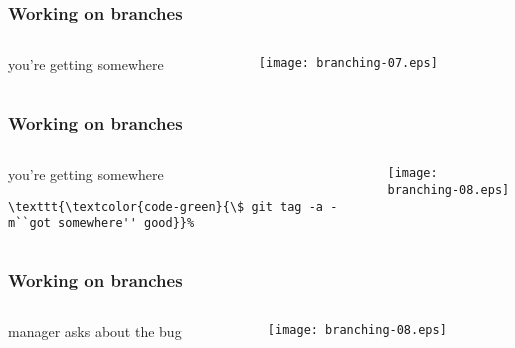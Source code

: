 \documentclass[english]{beamer}
\newcommand{\CMD}[1]{%
\texttt{\textcolor{code-green}{#1}}%
}
\begin{document}
\begin{frame}
\frametitle{Working on branches}

\begin{columns}[t]
        \begin{column}[T]{.5\textwidth}
                you're getting somewhere
        \end{column}
        \begin{column}[T]{.5\textwidth}
                \texttt{[image: branching-07.eps]}
        \end{column}
\end{columns}
\end{frame}

\begin{frame}[fragile]
\frametitle{Working on branches}

\begin{columns}[t]
        \begin{column}[T]{.5\textwidth}
                you're getting somewhere

                \vspace{\baselineskip}
                {\small
                \begin{Verbatim}[commandchars=\\\{\}]
\CMD{\$ git tag -a -m``got somewhere'' good}
                \end{Verbatim}
                }
        \end{column}
        \begin{column}[T]{.5\textwidth}
                \texttt{[image: branching-08.eps]}
        \end{column}
\end{columns}
\end{frame}

\begin{frame}[fragile]
\frametitle{Working on branches}

\begin{columns}[t]
        \begin{column}[T]{.5\textwidth}
                manager asks about the bug
        \end{column}
        \begin{column}[T]{.5\textwidth}
                \texttt{[image: branching-08.eps]}
        \end{column}
\end{columns}
\end{frame}
\end{document}
